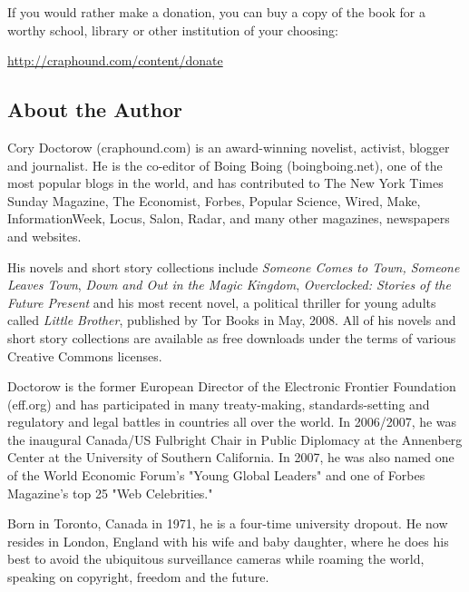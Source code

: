 If you would rather make a donation, you can buy a copy of the book
for a worthy school, library or other institution of your
choosing:

\href{http://craphound.com/content/donate}{http://craphound.com/content/donate}

\subsection{About the Author}

Cory Doctorow (craphound.com) is an award-winning novelist,
activist, blogger and journalist. He is the co-editor of Boing
Boing (boingboing.net), one of the most popular blogs in the world,
and has contributed to The New York Times Sunday Magazine, The
Economist, Forbes, Popular Science, Wired, Make, InformationWeek,
Locus, Salon, Radar, and many other magazines, newspapers and
websites.

His novels and short story collections include
\emph{Someone Comes to Town, Someone Leaves Town},
\emph{Down and Out in the Magic Kingdom},
\emph{Overclocked: Stories of the Future Present} and his most
recent novel, a political thriller for young adults called
\emph{Little Brother}, published by Tor Books in May, 2008. All
of his novels and short story collections are available as free
downloads under the terms of various Creative Commons licenses.

Doctorow is the former European Director of the Electronic Frontier
Foundation (eff.org) and has participated in many treaty-making,
standards-setting and regulatory and legal battles in countries all
over the world. In 2006/2007, he was the inaugural Canada/US
Fulbright Chair in Public Diplomacy at the Annenberg Center at the
University of Southern California. In 2007, he was also named one
of the World Economic Forum's "Young Global Leaders" and one of
Forbes Magazine's top 25 "Web Celebrities."

Born in Toronto, Canada in 1971, he is a four-time university
dropout. He now resides in London, England with his wife and baby
daughter, where he does his best to avoid the ubiquitous
surveillance cameras while roaming the world, speaking on
copyright, freedom and the future.


